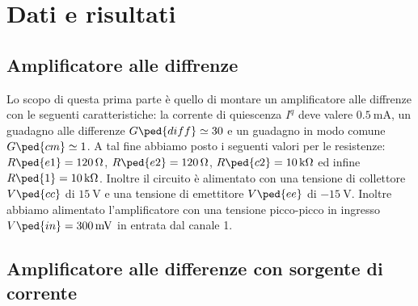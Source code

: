 \section*{Dati e risultati}

\subsection*{Amplificatore alle diffrenze}

Lo scopo di questa prima parte è quello di montare un amplificatore alle diffrenze con le seguenti caratteristiche: la corrente di quiescenza $I^q$ deve valere $\SI{0.5}{\milli\ampere}$, un guadagno alle differenze $G\ped{diff} \simeq 30$ e un guadagno in modo comune $G\ped{cm} \simeq 1$.
A tal fine abbiamo posto i seguenti valori per le resistenze: $R\ped{e1} = \SI{120}{\ohm}$, $R\ped{e2} = \SI{120}{\ohm}$, $R\ped{c2} = \SI{10}{\kilo\ohm}$ ed infine $R\ped{1} = \SI{10}{\kilo\ohm}$. Inoltre il circuito è alimentato con una tensione di collettore $V\ped{cc}$ di $\SI{15}{\volt}$ e una tensione di emettitore $V\ped{ee}$ di $\SI{-15}{\volt}$.
Inoltre abbiamo alimentato l'amplificatore con una tensione picco-picco in ingresso $V\ped{in} = \SI{300}{\milli\volt}$ in entrata dal canale 1.


\subsection*{Amplificatore alle differenze con sorgente di corrente}